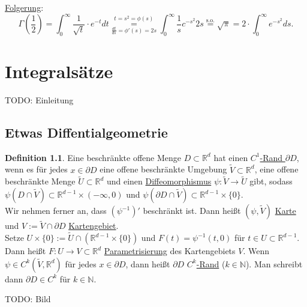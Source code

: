 \documentclass[a4paper]{report}
\newcommand{\R}{\mathbb{R}}
\newcommand{\N}{\mathbb{N}}
\newcommand{\overunderset}[3]{\overset{#1}{\underset{#3}{#2}}}
\newcommand{\jlabel}[1]{\label{j_#1}}
\newcommand{\jhyperref}[2]{\hyperref[j_#1]{#2}}
\newcommand{\jlink}[1]{\jhyperref{#1}{#1}}
\newcommand{\jabb}[3]{ #1: #2 \rightarrow #3 }
\newcommand{\jspace}{\vspace{8pt}}
\theoremstyle{plain}
\theoremstyle{definition}
\newtheorem{defn}[thm]{Definition}
\begin{document}
{{{{\uline{Folgerung}:
\[
    \Gamma \left(\frac{1}{2} \right) = \int_0^\infty \frac{1}{\sqrt{t}} \cdot e^{-t} dt \overunderset{t=s^2=\phi(s)}{=}{\frac{dt}{ds}=\phi'(s)=2s} \int_0^\infty \frac{1}{s}c^{-s^2} 2s \overset{\text{s.o.}}{=} \sqrt{\pi} = 2\cdot \int_0^\infty e^{-s^2} ds.
\]

\chapter{Integralsätze}
    TODO: Einleitung

\section{Etwas Diffentialgeometrie}

\begin{defn}
    \jlabel{Def 4.1}
    Eine beschränkte offene Menge $D\subset \R^d$ hat einen \uline{$C^1$-Rand $\partial D$}, wenn es für jedes $x\in \partial D$ eine offene beschränkte Umgebung $\tilde{V}\subset \R^d$, eine offene beschränkte Menge $\tilde{U}\subset \R^d$ und einen \jlink{Diffeomorphismus} $\jabb{\psi}{\tilde{V}}{\tilde{U}}$ gibt, sodass $\psi(D\cap \tilde{V}) \subset \R^{d-1}\times (-\infty,0)$ und $\psi(\partial D\cap \tilde{V}) \subset \R^{d-1}\times \{0\}$.\\
    Wir nehmen ferner an, dass $(\psi^{-1})'$ beschränkt ist. Dann heißt $(\psi, \tilde{V})$ \jlabel{Karte}\uline{Karte} und $V:= \tilde{V}\cap \partial D$ \jlabel{Kartengebiet}\uline{Kartengebiet}.\\
    Setze $U\times \{0\} := \tilde{U} \cap (\R^{d-1}\times \{0\})$ und $F(t) = \psi^{-1}(t,0)$ für $t\in U \subset \R^{d-1}$. Dann heißt $\jabb{F}{U}{V\subset \R^d}$ \jlabel{Parametrisierung}\uline{Parametrisierung} des Kartengebiets $V$. Wenn $\psi \in C^k(\tilde{V}, \R^d)$ für jedes $x\in \partial D$, dann heißt $\partial D$ \uline{$C^k$-Rand} ($k\in\N$). Man schreibt dann $\partial D \in C^k$ für $k\in\N$.
    
    \jspace
    
    TODO: Bild
    
    \jspace
\end{defn}

}}}}
\end{document}
